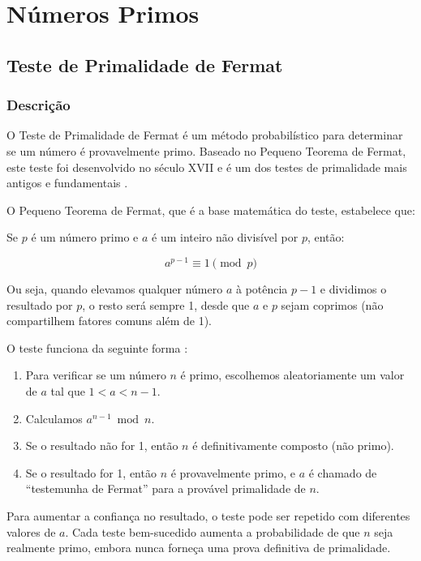 \chapter{Números Primos}\label{chap:numeros-primos}

\section{Teste de Primalidade de Fermat}

\subsection{Descrição}

O Teste de Primalidade de Fermat é um método probabilístico para determinar se um número é provavelmente primo. Baseado no Pequeno Teorema de Fermat, este teste foi desenvolvido no século XVII e é um dos testes de primalidade mais antigos e fundamentais \cite{cohen1993course}.

O Pequeno Teorema de Fermat, que é a base matemática do teste, estabelece que:

Se $p$ é um número primo e $a$ é um inteiro não divisível por $p$, então:

\begin{equation}
a^{p-1} \equiv 1 \pmod{p}
\end{equation}

Ou seja, quando elevamos qualquer número $a$ à potência $p-1$ e dividimos o resultado por $p$, o resto será sempre 1, desde que $a$ e $p$ sejam coprimos (não compartilhem fatores comuns além de 1).

O teste funciona da seguinte forma \cite{cohen1993course}:

\begin{enumerate}
    \item Para verificar se um número $n$ é primo, escolhemos aleatoriamente um valor de $a$ tal que $1 < a < n-1$.
    \item Calculamos $a^{n-1} \bmod n$.
    \item Se o resultado não for 1, então $n$ é definitivamente composto (não primo).
    \item Se o resultado for 1, então $n$ é provavelmente primo, e $a$ é chamado de ``testemunha de Fermat'' para a provável primalidade de $n$.
\end{enumerate}

Para aumentar a confiança no resultado, o teste pode ser repetido com diferentes valores de $a$. Cada teste bem-sucedido aumenta a probabilidade de que $n$ seja realmente primo, embora nunca forneça uma prova definitiva de primalidade.

